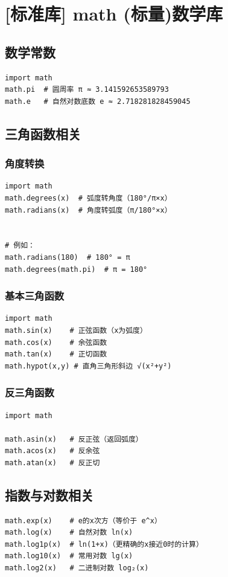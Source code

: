 \chapter{[标准库] math (标量)数学库}

\section{数学常数}
\begin{lstlisting}[style=demostyle,numbers=none]
import math
math.pi  # 圆周率 π ≈ 3.141592653589793
math.e   # 自然对数底数 e ≈ 2.718281828459045
\end{lstlisting}

\section{三角函数相关}
\subsection{角度转换}
\begin{lstlisting}[style=demostyle,numbers=none]
import math
math.degrees(x)  # 弧度转角度（180°/π×x）
math.radians(x)  # 角度转弧度（π/180°×x）


# 例如：
math.radians(180)  # 180° = π
math.degrees(math.pi)  # π = 180°
\end{lstlisting}

\subsection{基本三角函数}
\begin{lstlisting}[style=demostyle,numbers=none]
import math
math.sin(x)    # 正弦函数（x为弧度）
math.cos(x)    # 余弦函数
math.tan(x)    # 正切函数
math.hypot(x,y) # 直角三角形斜边 √(x²+y²)
\end{lstlisting}

\subsection{反三角函数}
\begin{lstlisting}[style=demostyle,numbers=none]
import math

math.asin(x)   # 反正弦（返回弧度）
math.acos(x)   # 反余弦
math.atan(x)   # 反正切
\end{lstlisting}

\section{指数与对数相关}
\begin{lstlisting}[style=demostyle,numbers=none]
math.exp(x)    # e的x次方（等价于 e^x）
math.log(x)    # 自然对数 ln(x)
math.log1p(x)  # ln(1+x)（更精确的x接近0时的计算）
math.log10(x)  # 常用对数 lg(x)
math.log2(x)   # 二进制对数 log₂(x)
\end{lstlisting}


